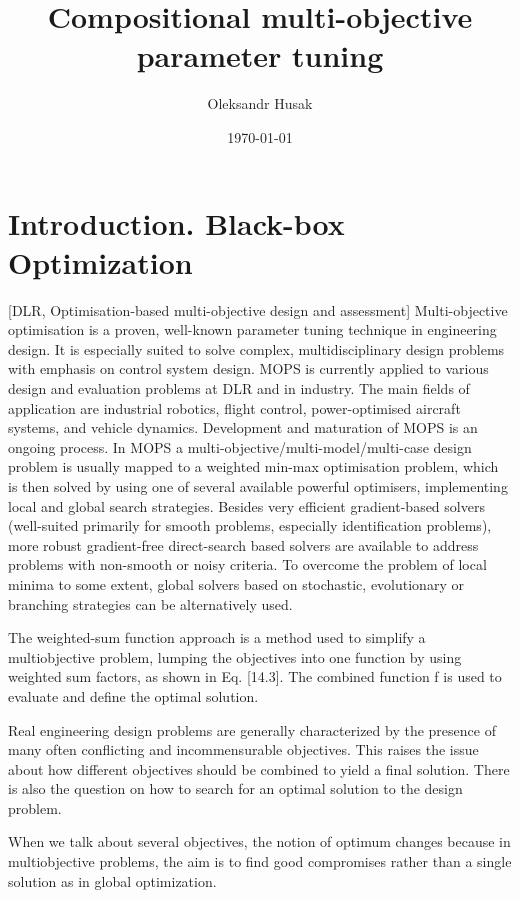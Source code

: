 \documentclass[ms,english]{stthesis}
\title{Compositional multi-objective parameter tuning}
\author{Oleksandr Husak}
\date{\today}
\begin{document}
    \maketitle %
  
    \tableofcontents
  
    \chapter{Introduction. Black-box Optimization}
        [DLR, Optimisation-based multi-objective design and assessment] 
        Multi-objective optimisation is a proven, well-known parameter tuning technique in engineering design. It is especially suited 
        to solve complex, multidisciplinary design problems with emphasis on control system design.
        MOPS is currently applied to various design and evaluation problems at DLR and in industry. The main fields 
        of application are industrial robotics, flight control, power-optimised aircraft systems, and vehicle dynamics. Development and maturation of MOPS is an ongoing process.
        In MOPS a multi-objective/multi-model/multi-case design problem is usually mapped to a weighted min-max optimisation problem, which is then solved by using one of several 
        available powerful optimisers, implementing local and global search strategies. Besides very efficient gradient-based solvers (well-suited primarily for smooth problems, 
        especially identification problems), more robust gradient-free direct-search based solvers are available to address problems with non-smooth or noisy criteria. To overcome the 
        problem of local minima to some extent, global solvers based on stochastic, evolutionary or branching strategies can be alternatively used.

        The weighted-sum function approach is a method used to simplify a multiobjective problem, lumping the objectives into 
        one function by using weighted sum factors, as shown in Eq. [14.3]. The combined function f is used to evaluate and define the optimal solution.

        Real engineering design problems are generally characterized by the presence of many
        often conflicting and incommensurable objectives. This raises the issue about how
        different objectives should be combined to yield a final solution. There is also the
        question on how to search for an optimal solution to the design problem. 

        When we talk about several objectives, the notion of optimum changes because in multiobjective problems, the aim is to find good compromises rather than a single solution as in global optimization.
\end{document}
